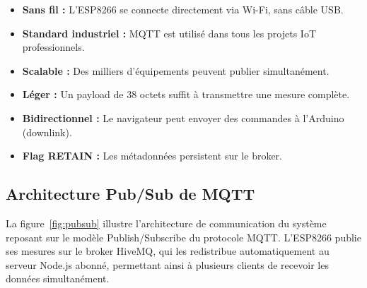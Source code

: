 \documentclass[12pt, a4paper]{report}
\begin{document}
\begin{infobox}
\begin{itemize}[leftmargin=0.8cm, itemsep=3pt]
  \item[\ding{51}] \textbf{Sans fil :} L'ESP8266 se connecte
        directement via Wi-Fi, sans c\^able USB.
  \item[\ding{51}] \textbf{Standard industriel :} MQTT est utilis\'e
        dans tous les projets IoT professionnels.
  \item[\ding{51}] \textbf{Scalable :} Des milliers d'\'equipements
        peuvent publier simultan\'ement.
  \item[\ding{51}] \textbf{L\'eger :} Un payload de 38 octets suffit
        \`a transmettre une mesure compl\`ete.
  \item[\ding{51}] \textbf{Bidirectionnel :} Le navigateur peut envoyer
        des commandes \`a l'Arduino (downlink).
  \item[\ding{51}] \textbf{Flag RETAIN :} Les m\'etadonn\'ees persistent
        sur le broker.
\end{itemize}
\end{infobox}

\subsection{Architecture Pub/Sub de MQTT}

La figure~\ref{fig:pubsub} illustre l'architecture de communication du
syst\`eme reposant sur le mod\`ele Publish/Subscribe du protocole MQTT.
L'ESP8266 publie ses mesures sur le broker HiveMQ, qui les redistribue
automatiquement au serveur Node.js abonn\'e, permettant ainsi \`a
plusieurs clients de recevoir les donn\'ees simultan\'ement.
\end{document}
